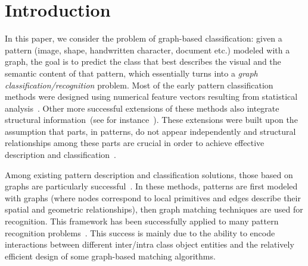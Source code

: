 \documentclass[journal]{IEEEtran}
\theoremstyle{definition}
\begin{document}
\section{Introduction}
\label{sec:intro}

In this paper, we consider the problem of graph-based classification: given a pattern (image, shape, handwritten character, document etc.) modeled with a graph, the goal is to predict the class that best describes the visual and the semantic content of that pattern, which essentially turns into a \emph{graph classification/recognition} problem. Most of the early pattern classification methods were designed using numerical feature vectors resulting from statistical analysis~\cite{Csurka2004,Ling2007a}. Other more successful extensions of these methods also integrate structural information~(see for instance~\cite{Lazebnik2006}). These extensions were built upon the assumption that parts, in patterns, do not appear independently and structural relationships among these parts are crucial in order to achieve effective description and classification~\cite{Harchaoui2007}.

Among existing pattern description and classification solutions, those based on graphs are particularly successful~\cite{Conte2004,Duchenne2011,Foggia2014}. In these methods, patterns are first modeled with graphs (where nodes correspond to local primitives and edges describe their spatial and geometric relationships), then graph matching techniques are used for recognition. This framework has been successfully applied to many pattern recognition problems~\cite{Cho2010,Sharma2011,Duchenne2011,Zhou2013,Wu2014}. This success is mainly due to the ability to encode interactions between different inter/intra class object entities and the relatively efficient design of some graph-based matching algorithms. 
\end{document}
